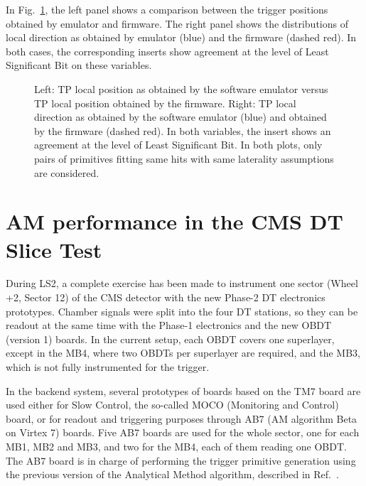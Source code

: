 \documentclass[../main.tex]{subfiles}
\begin{document}
In Fig.~\ref{dts:fig:fwemu_pos_slope}, the left panel shows a comparison between the trigger positions obtained by emulator and firmware. The right panel shows the distributions of local direction as obtained by emulator (blue) and the firmware (dashed red). In both cases, the corresponding inserts show agreement at the level of Least Significant Bit on these variables.

\begin{figure}[h!]
\begin{center}
\end{center}
\caption{Left: TP local position as obtained by the software emulator versus TP local position obtained by the firmware. Right: TP local direction as obtained by the software emulator (blue) and obtained by the firmware (dashed red). In both variables, the insert shows an agreement at the level of Least Significant Bit. In both plots, only pairs of primitives fitting same hits with same laterality assumptions are considered.}
\label{dts:fig:fwemu_pos_slope}
\end{figure}


\section{AM performance in the CMS DT Slice Test}
\label{hh:sec:st}

During LS2, a complete exercise has been made to instrument one sector (Wheel +2, Sector 12) of the CMS detector with the new Phase-2 DT electronics prototypes. Chamber signals were split into the four DT stations, so they can be readout at the same time with the Phase-1 electronics and the new OBDT (version 1) boards. In the current setup, each OBDT covers one superlayer, except in the MB4, where two OBDTs per superlayer are required, and the MB3, which is not fully instrumented for the trigger. %

In the backend system, several prototypes of boards based on the TM7 board \cite{dts:intro:barrel_upgrade} are used either for Slow Control, the so-called MOCO (Monitoring and Control) board, or for readout and triggering purposes through AB7 (AM algorithm Beta on Virtex 7) boards. Five AB7 boards are used for the whole sector, one for each MB1, MB2 and MB3, and two for the MB4, each of them reading one OBDT. The AB7 board is in charge of performing the trigger primitive generation using the previous version of the Analytical Method algorithm, described in Ref.~\cite{dts:intro:am}.
\end{document}
